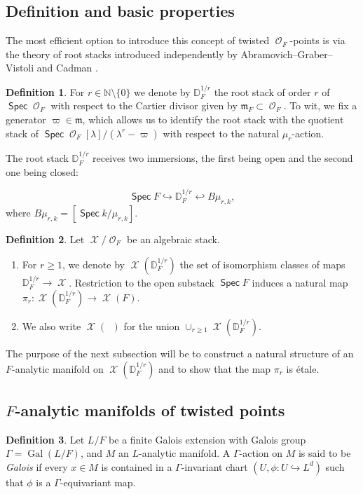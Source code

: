 \documentclass{article}
\DeclareMathOperator{\Xc}{\mathcal{X}}
\DeclareMathOperator{\Oc}{\mathcal{O}}
\DeclareMathOperator{\Gal}{Gal}
\DeclareMathOperator{\Spec}{\mathsf{Spec}}
\newcommand{\Dr}[1][r]{\mathbb{D}_F^{1/#1}}
\DeclareMathOperator{\Dinfty}{\mathbb{D}_F^{1/\infty}}
\theoremstyle{definition}
\newtheorem{definition}{Definition}[section]
\theoremstyle{plain}
\begin{document}
\subsection{Definition and basic properties}
The most efficient option to introduce this concept of twisted $\Oc_F$-points is via the theory of root stacks introduced independently by Abramovich--Graber--Vistoli \cite{MR2450211} and Cadman \cite{1117817b-301b-381d-b9c7-cb40e4814623}.

\begin{definition}
For $r \in \mathbb{N} \setminus \{0\}$ we denote by $\Dr$ the root stack of order $r$ of $\Spec \Oc_F$ with respect to the Cartier divisor given by $\mathfrak{m}_F \subset \Oc_F$. To wit, we fix a generator $\varpi \in \mathfrak{m}$, which allows us to identify the root stack with the quotient stack of $\Spec \Oc_F[\lambda]/(\lambda^r-\varpi)$ with respect to the natural $\mu_r$-action. 
\end{definition}

The root stack $\Dr$ receives two immersions, the first being open and the second one being closed:

$$\Spec F \hookrightarrow \Dr \hookleftarrow  B\mu_{r,k},$$
where $B\mu_{r,k}=[\Spec k / \mu_{r,k}]$.

\begin{definition}
 Let $\Xc /\Oc_F$ be an algebraic stack.
 \begin{enumerate}
     \item For $r \geq 1$, we denote by $\Xc(\Dr)$ the set of isomorphism classes of maps $\Dr \to \Xc$. Restriction to the open substack $\Spec F$ induces a natural map $\pi_r\colon \Xc(\Dr) \to \Xc(F)$. 
     \item We also write $\Xc(\Dinfty)$ for the union $\cup_{r\geq 1} \Xc(\Dr)$.
 \end{enumerate}    
\end{definition}

The purpose of the next subsection will be to construct a natural structure of an $F$-analytic manifold on $\Xc(\Dr)$ and to show that the map $\pi_r$ is \'etale.

\subsection{$F$-analytic manifolds of twisted points}

\begin{definition}
 Let $L/F$ be a finite Galois extension with Galois group $\Gamma = \Gal(L/F)$, and $M$ an $L$-analytic manifold. A $\Gamma$-action on $M$ is said to be \emph{Galois} if every $x\in M$ is contained in a $\Gamma$-invariant chart $(U,\phi\colon U \hookrightarrow L^d)$ such that $\phi$ is a $\Gamma$-equivariant map.
\end{definition}
\end{document}
